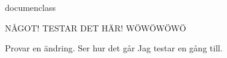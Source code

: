 {documenclass}

NÅGOT! TESTAR DET HÄR! WÖWÖWÖWÖ

Provar en ändring. Ser hur det går
Jag testar en gång till.